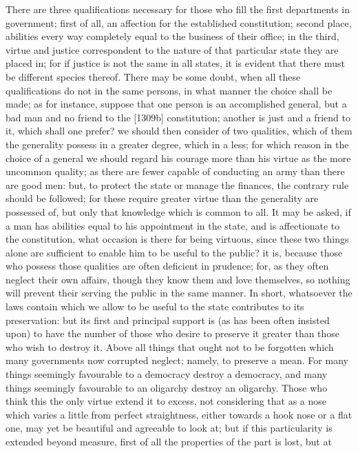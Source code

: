 There are three qualifications necessary for those who fill the first
departments in government; first of all, an affection for the established
constitution; second place, abilities every way completely equal to the
business of their office; in the third, virtue and justice correspondent
to the nature of that particular state they are placed in; for if justice
is not the same in all states, it is evident that there must be different
species thereof. There may be some doubt, when all these qualifications do
not in the same persons, in what manner the choice shall be made; as for
instance, suppose that one person is an accomplished general, but a bad
man and no friend to the [1309b] constitution; another is just and a
friend to it, which shall one prefer? we should then consider of two
qualities, which of them the generality possess in a greater degree, which
in a less; for which reason in the choice of a general we should regard
his courage more than his virtue as the more uncommon quality; as there
are fewer capable of conducting an army than there are good men: but, to
protect the state or manage the finances, the contrary rule should be
followed; for these require greater virtue than the generality are
possessed of, but only that knowledge which is common to all. It may be
asked, if a man has abilities equal to his appointment in the state, and
is affectionate to the constitution, what occasion is there for being
virtuous, since these two things alone are sufficient to enable him to be
useful to the public? it is, because those who possess those qualities are
often deficient in prudence; for, as they often neglect their own affairs,
though they know them and love themselves, so nothing will prevent their
serving the public in the same manner. In short, whatsoever the laws
contain which we allow to be useful to the state contributes to its
preservation: but its first and principal support is (as has been often
insisted upon) to have the number of those who desire to preserve it
greater than those who wish to destroy it. Above all things that ought not
to be forgotten which many governments now corrupted neglect; namely, to
preserve a mean. For many things seemingly favourable to a democracy
destroy a democracy, and many things seemingly favourable to an oligarchy
destroy an oligarchy. Those who think this the only virtue extend it to
excess, not considering that as a nose which varies a little from perfect
straightness, either towards a hook nose or a flat one, may yet be
beautiful and agreeable to look at; but if this particularity is extended
beyond measure, first of all the properties of the part is lost, but at
